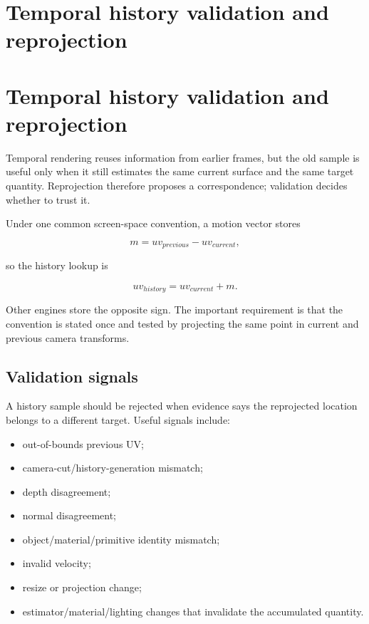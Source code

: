 \hypertarget{appendix-e8c352e39466}{}
\section*{Temporal history validation and reprojection}
\section{Temporal history validation and reprojection}\label{appendix-e8c352e39466-temporal-history-validation-and-reprojection}

Temporal rendering reuses information from earlier frames, but the old sample is useful only when it still estimates the same current surface and the same target quantity. Reprojection therefore proposes a correspondence; validation decides whether to trust it.

Under one common screen-space convention, a motion vector stores

\[
m = uv_{previous}-uv_{current},
\]

so the history lookup is

\[
uv_{history}=uv_{current}+m.
\]

Other engines store the opposite sign. The important requirement is that the convention is stated once and tested by projecting the same point in current and previous camera transforms.

\subsection{Validation signals}\label{appendix-e8c352e39466-validation-signals}

A history sample should be rejected when evidence says the reprojected location belongs to a different target. Useful signals include:

\begin{itemize}
\tightlist
\item
  out-of-bounds previous UV;
\item
  camera-cut/history-generation mismatch;
\item
  depth disagreement;
\item
  normal disagreement;
\item
  object/material/primitive identity mismatch;
\item
  invalid velocity;
\item
  resize or projection change;
\item
  estimator/material/lighting changes that invalidate the accumulated quantity.
\end{itemize}

